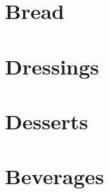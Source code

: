 \documentclass[%
letter,
11pt
]{article}
\begin{document}
\section{Bread}









\section{Dressings}



\section{Desserts}










\section{Beverages}







\end{document}
